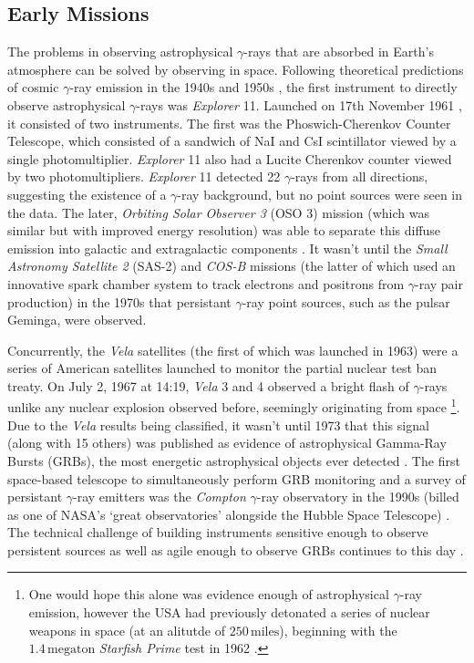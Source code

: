 \subsection{Early Missions}
The problems in observing astrophysical $\gamma$-rays that are absorbed in Earth's atmosphere can be solved by observing in space. Following theoretical predictions of cosmic $\gamma$-ray emission in the 1940s and 1950s \cite{morrison}, the first instrument to directly observe astrophysical $\gamma$-rays was \textit{Explorer} 11. Launched on 17th November 1961 \cite{explorer}, it consisted of two instruments. The first was the Phoswich-Cherenkov Counter Telescope, which consisted of a sandwich of NaI and CsI scintillator viewed by a single photomultiplier. \textit{Explorer} 11 also had a  Lucite Cherenkov counter viewed by two photomultipliers. \textit{Explorer} 11 detected 22 $\gamma$-rays from all directions, suggesting the existence of a $\gamma$-ray background, but no point sources were seen in the data. The later, \textit{Orbiting Solar Observer 3} (OSO 3) mission (which was similar but with improved energy resolution) was able to separate this diffuse emission into galactic and extragalactic components \cite{oso3}. It wasn't until the \textit{Small Astronomy Satellite 2} (SAS-2) \cite{sas2} and \textit{COS-B} \cite{cosb} missions (the latter of which used an innovative spark chamber system to track electrons and positrons from $\gamma$-ray pair production) in the 1970s that persistant $\gamma$-ray point sources, such as the pulsar Geminga, were observed.

Concurrently, the \textit{Vela} satellites (the first of which was launched in 1963) were a series of American satellites launched to monitor the partial nuclear test ban treaty. On July 2, 1967 at 14:19, \textit{Vela} 3 and 4 observed a bright flash of $\gamma$-rays unlike any nuclear explosion observed before, seemingly originating from space \footnote{One would hope this alone was evidence enough of astrophysical $\gamma$-ray emission, however the USA had previously detonated a series of nuclear weapons in space (at an alitutde of $\mathrm{250\,miles}$), beginning with the $\mathrm{1.4\,megaton}$ \textit{Starfish Prime} test in 1962 \cite{starfish}.}. Due to the \textit{Vela} results being classified, it wasn't until 1973 that this signal (along with 15 others) was published as evidence of astrophysical Gamma-Ray Bursts (GRBs), the most energetic astrophysical objects ever detected \cite{velagrb}. The first space-based telescope to simultaneously perform GRB monitoring and a survey of persistant $\gamma$-ray emitters was the \textit{Compton} $\gamma$-ray observatory in the 1990s (billed as one of NASA's `great observatories' alongside the Hubble Space Telescope) \cite{compton}. The technical challenge of building instruments sensitive enough to observe persistent sources as well as agile enough to observe GRBs continues to this day \cite{magicGRB}.

